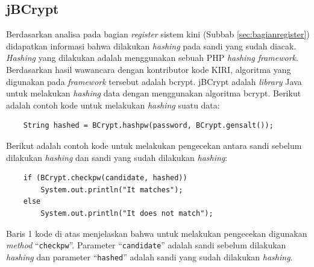 \subsection{jBCrypt}
\label{sec:jbcrypt}
Berdasarkan analisa pada bagian \textit{register} sistem kini (Subbab \ref{sec:bagianregister}) didapatkan informasi bahwa dilakukan \textit{hashing} pada sandi yang sudah diacak. \textit{Hashing} yang dilakukan adalah menggunakan sebuah PHP \textit{hashing framework}\cite{openwall}. Berdasarkan hasil wawancara dengan kontributor kode KIRI, algoritma yang digunakan pada \textit{framework} tersebut adalah bcrypt. jBCrypt adalah \textit{library} Java untuk melakukan \textit{hashing} data dengan menggunakan algoritma bcrypt\cite{jbcrypt}. Berikut adalah contoh kode untuk melakukan \textit{hashing} suatu data:
\begin{lstlisting}
	String hashed = BCrypt.hashpw(password, BCrypt.gensalt());
\end{lstlisting}

Berikut adalah contoh kode untuk melakukan pengecekan antara sandi sebelum dilakukan \textit{hashing} dan sandi yang sudah dilakukan \textit{hashing}:
\begin{lstlisting}
	if (BCrypt.checkpw(candidate, hashed))
		System.out.println("It matches");
	else
		System.out.println("It does not match");
\end{lstlisting}

Baris 1 kode di atas menjelaskan bahwa untuk melakukan pengecekan digunakan \textit{method} ``\texttt{checkpw}''. Parameter ``\texttt{candidate}'' adalah sandi sebelum dilakukan \textit{hashing} dan parameter ``\texttt{hashed}'' adalah sandi yang sudah dilakukan \textit{hashing}.
